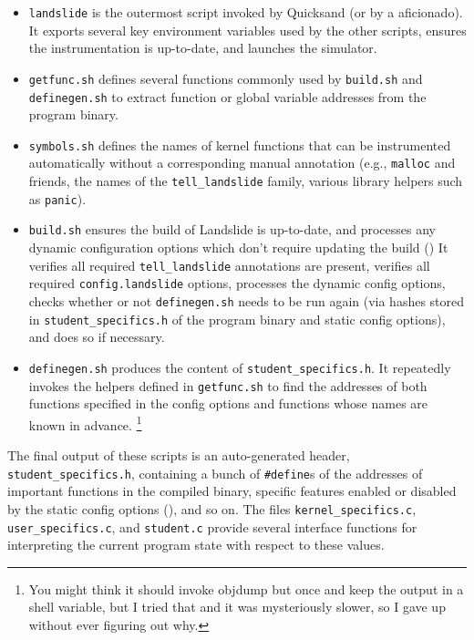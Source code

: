 \begin{itemize}
	\item {\tt landslide} is the outermost script invoked by Quicksand (or by a \sect{\ref{sec:landslide-directly}} aficionado).
		It exports several key environment variables used by the other scripts,
		ensures the instrumentation is up-to-date,
		and launches the simulator.
	\item {\tt getfunc.sh} defines several functions commonly used by {\tt build.sh} and {\tt definegen.sh} to extract function or global variable addresses from the program binary.
	\item {\tt symbols.sh} defines the names of kernel functions that can be instrumented automatically without a corresponding manual annotation (e.g., {\tt malloc} and friends, the names of the {\tt tell\_landslide} family, various library helpers such as {\tt panic}).
	\item {\tt build.sh} ensures the build of Landslide is up-to-date,
		and processes any dynamic configuration options which don't require updating the build (\sect{\ref{sec:landslide-dynamicconfig}})
		It verifies all required {\tt tell\_landslide} annotations are present,
		verifies all required {\tt config.\allowbreak{}landslide} options,
		processes the dynamic config options,
		checks whether or not {\tt definegen.sh} needs to be run again (via hashes stored in {\tt student\_specifics.h} of the program binary and static config options),
		and does so if necessary.
	\item {\tt definegen.sh} produces the
		content of {\tt student\_specifics.h}.
		It repeatedly invokes the helpers defined in {\tt getfunc.sh}
		to find the addresses of both functions specified in the config options
		and functions whose names are known in advance.%
		\footnote{You might think it should invoke objdump but once and keep the output in a shell variable,
		but I tried that and it was mysteriously slower, so I gave up without ever figuring out why.}
\end{itemize}

The final output of these scripts is an auto-generated header, {\tt student\_specifics.h},
containing a bunch of {\tt \#define}s of the addresses of important functions in the compiled binary,
specific features enabled or disabled by the static config options (\sect{\ref{sec:landslide-staticconfig}}),
and so on.
The files {\tt kernel\_specifics.c}, {\tt user\_specifics.c}, and {\tt student.c} provide several interface functions
for interpreting the current program state with respect to these values.

